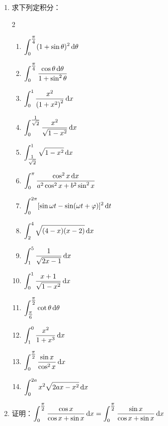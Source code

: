 \begin{ex}
\begin{enumerate}
    \item 求下列定积分：
\begin{multicols}{2}
\begin{enumerate}
    \item $\displaystyle\int_{0}^{\tfrac{\pi}{4}}(1+\sin \theta)^{2} \,{\rm d} \theta $ 
    \item $\displaystyle\int_{0}^{\tfrac{\pi}{4}} \dfrac{\cos \theta \,{\rm d} \theta}{1+\sin ^{2} \theta}$
    \item $\displaystyle\int_{0}^{1} \dfrac{x^{2}}{\left(1+x^{2}\right)^{2}} \,{\rm d} x$
    \item $\displaystyle\int_{0}^{\tfrac{1}{\sqrt{2}}} \dfrac{x^{2}}{\sqrt{1-x^{2}}} \,{\rm d} x$
    \item $\displaystyle\int_{\tfrac{1}{\sqrt{2}}}^{1} \sqrt{1-x^{2}} \,{\rm d} x$
    \item $\displaystyle\int_{0}^{\pi} \dfrac{\cos ^{2} x \,{\rm d} x}{a^{2} \cos ^{2} x+b^{2} \sin^{2} x}$
    \item $\displaystyle\int_{0}^{2 \pi}[\sin \omega t -\sin (\omega t+\varphi)]^{2} \,{\rm d} t$
    \item $\displaystyle\int_{2}^{4} \sqrt{(4-x)(x-2)} \,{\rm d} x$
    \item $\displaystyle\int_{1}^{5} \dfrac{1}{\sqrt{2 x-1}} \,{\rm d} x$ 
    \item $\displaystyle\int_{0}^{1} \dfrac{x+1}{\sqrt{1 - x^{2}}} \,{\rm d} x$
    \item $\displaystyle\int_{\tfrac{\pi}{6}}^{\tfrac{\pi}{2}} \cot \theta \,{\rm d} \theta$
    \item $\displaystyle\int_{1}^{0} \dfrac{x^{2}}{ 1+x^{3}} \,{\rm d} x$
    \item $\displaystyle\int^{\tfrac{\pi}{2}}_0 \dfrac{\sin x}{\cos^2 x}\,{\rm d} x$
    \item $\displaystyle\int^{2a}_0 x^2\sqrt{2ax-x^2}\,{\rm d} x$
\end{enumerate}
\end{multicols}

\item 证明：$\displaystyle\int^{\tfrac{\pi}{2}}_0 \dfrac{\cos x}{\cos x+\sin x}\,{\rm d} x=\displaystyle\int^{\tfrac{\pi}{2}}_0 \dfrac{\sin x}{\cos x+\sin x}\,{\rm d} x$


\end{enumerate}
\end{ex}
